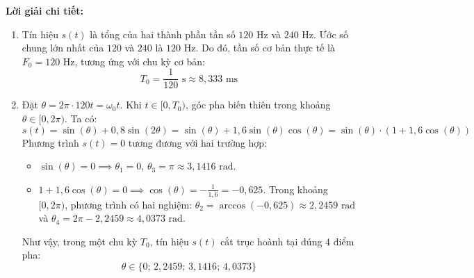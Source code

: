 \noindent\textbf{Lời giải chi tiết:}
\begin{enumerate}[label=\alph*)]
    \item Tín hiệu $s(t)$ là tổng của hai thành phần tần số $120\text{ Hz}$ và $240\text{ Hz}$. Ước số chung lớn nhất của $120$ và $240$ là $120\text{ Hz}$. Do đó, tần số cơ bản thực tế là $F_0 = 120\text{ Hz}$, tương ứng với chu kỳ cơ bản:
    \begin{equation}
        T_0 = \frac{1}{120}\text{ s} \approx 8{,}333\text{ ms}
    \end{equation}

    \item Đặt $\theta = 2\pi \cdot 120 t = \omega_0 t$. Khi $t \in [0, T_0)$, góc pha biến thiên trong khoảng $\theta \in [0, 2\pi)$. Ta có:
    \begin{equation}
        s(t) = \sin(\theta) + 0{,}8 \sin(2\theta) = \sin(\theta) + 1{,}6 \sin(\theta)\cos(\theta) = \sin(\theta) \cdot (1 + 1{,}6 \cos(\theta))
    \end{equation}
    Phương trình $s(t) = 0$ tương đương với hai trường hợp:
    \begin{itemize}[leftmargin=1.5em, itemsep=2pt]
        \item $\sin(\theta) = 0 \implies \theta_1 = 0$, $\theta_3 = \pi \approx 3{,}1416\text{ rad}$.
        \item $1 + 1{,}6 \cos(\theta) = 0 \implies \cos(\theta) = -\frac{1}{1{,}6} = -0{,}625$. Trong khoảng $[0, 2\pi)$, phương trình có hai nghiệm: $\theta_2 = \arccos(-0{,}625) \approx 2{,}2459\text{ rad}$ và $\theta_4 = 2\pi - 2{,}2459 \approx 4{,}0373\text{ rad}$.
    \end{itemize}
    Như vậy, trong một chu kỳ $T_0$, tín hiệu $s(t)$ cắt trục hoành tại đúng 4 điểm pha:
    \begin{equation}
        \theta \in \{0;\, 2{,}2459;\, 3{,}1416;\, 4{,}0373\}
    \end{equation}


\end{enumerate}
